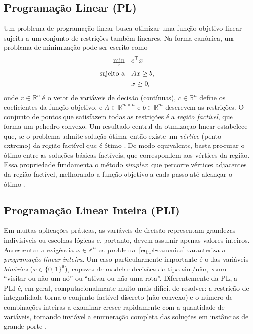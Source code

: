 \subsection{Programação Linear (PL)}
Um problema de programação linear busca otimizar uma função objetivo linear sujeita a um conjunto de restrições também lineares. Na forma canônica, um problema de minimização pode ser escrito como
\begin{align}
    \min_{x}\quad & c^{\top} x \notag \\
    \text{sujeito a}\quad & A x \ge b, \label{eq:pl-canonica} \\
    & x \ge 0, \notag
\end{align}
onde $x \in \mathbb{R}^n$ é o vetor de variáveis de decisão (contínuas), $c \in \mathbb{R}^n$ define os coeficientes da função objetivo, e $A \in \mathbb{R}^{m \times n}$ e $b \in \mathbb{R}^m$ descrevem as restrições. O conjunto de pontos que satisfazem todas as restrições é a \emph{região factível}, que forma um poliedro convexo. Um resultado central da otimização linear estabelece que, se o problema admite solução ótima, então existe um \emph{vértice} (ponto extremo) da região factível que é ótimo \cite[Propriedade~2.2]{arenales2007pesquisa}. De modo equivalente, basta procurar o ótimo entre as soluções básicas factíveis, que correspondem aos vértices da região. Essa propriedade fundamenta o método \emph{simplex}, que percorre vértices adjacentes da região factível, melhorando a função objetivo a cada passo até alcançar o ótimo \cite{arenales2007pesquisa}.

\subsection{Programação Linear Inteira (PLI)}
Em muitas aplicações práticas, as variáveis de decisão representam grandezas indivisíveis ou escolhas lógicas e, portanto, devem assumir apenas valores inteiros. Acrescentar a exigência $x \in \mathbb{Z}^n$ ao problema~\eqref{eq:pl-canonica} caracteriza a \emph{programação linear inteira}. Um caso particularmente importante é o das variáveis \emph{binárias} ($x \in \{0,1\}^n$), capazes de modelar decisões do tipo sim/não, como ``visitar ou não um nó'' ou ``ativar ou não uma rota''. Diferentemente da PL, a PLI é, em geral, computacionalmente muito mais difícil de resolver: a restrição de integralidade torna o conjunto factível discreto (não convexo) e o número de combinações inteiras a examinar cresce rapidamente com a quantidade de variáveis, tornando inviável a enumeração completa das soluções em instâncias de grande porte \cite{arenales2007pesquisa}.

